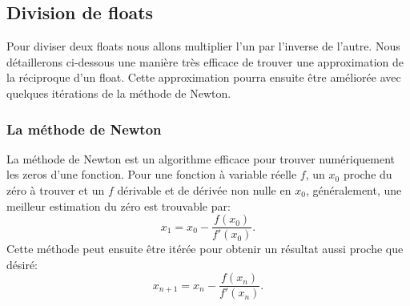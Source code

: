 \documentclass{article}
\begin{document}
\subsection{Division de floats}
Pour diviser deux floats nous allons multiplier l'un par l'inverse de l'autre. Nous détaillerons ci-dessous une manière très efficace de trouver une approximation de la réciproque d'un float. Cette approximation pourra ensuite être améliorée avec quelques itérations de la méthode de Newton.
\subsubsection{La méthode de Newton}
La méthode de Newton est un algorithme efficace pour trouver numériquement les zeros d'une fonction. Pour une fonction à variable réelle $f$, un $x_0$ proche du zéro à trouver et un $f$ dérivable et de dérivée non nulle en $x_0$, généralement, une meilleur estimation du zéro est trouvable par:
$$x_1 = x_0-\frac{f(x_0)}{f'(x_0)}.$$
Cette méthode peut ensuite être itérée pour obtenir un résultat aussi proche que désiré:
$$x_{n+1} = x_n-\frac{f(x_n)}{f'(x_n)}.$$
\end{document}
